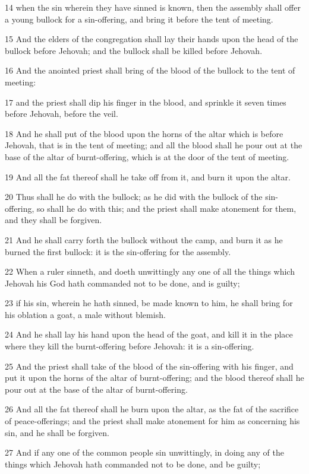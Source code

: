 \par 14 when the sin wherein they have sinned is known, then the assembly shall offer a young bullock for a sin-offering, and bring it before the tent of meeting.
\par 15 And the elders of the congregation shall lay their hands upon the head of the bullock before Jehovah; and the bullock shall be killed before Jehovah.
\par 16 And the anointed priest shall bring of the blood of the bullock to the tent of meeting:
\par 17 and the priest shall dip his finger in the blood, and sprinkle it seven times before Jehovah, before the veil.
\par 18 And he shall put of the blood upon the horns of the altar which is before Jehovah, that is in the tent of meeting; and all the blood shall he pour out at the base of the altar of burnt-offering, which is at the door of the tent of meeting.
\par 19 And all the fat thereof shall he take off from it, and burn it upon the altar.
\par 20 Thus shall he do with the bullock; as he did with the bullock of the sin-offering, so shall he do with this; and the priest shall make atonement for them, and they shall be forgiven.
\par 21 And he shall carry forth the bullock without the camp, and burn it as he burned the first bullock: it is the sin-offering for the assembly.
\par 22 When a ruler sinneth, and doeth unwittingly any one of all the things which Jehovah his God hath commanded not to be done, and is guilty;
\par 23 if his sin, wherein he hath sinned, be made known to him, he shall bring for his oblation a goat, a male without blemish.
\par 24 And he shall lay his hand upon the head of the goat, and kill it in the place where they kill the burnt-offering before Jehovah: it is a sin-offering.
\par 25 And the priest shall take of the blood of the sin-offering with his finger, and put it upon the horns of the altar of burnt-offering; and the blood thereof shall he pour out at the base of the altar of burnt-offering.
\par 26 And all the fat thereof shall he burn upon the altar, as the fat of the sacrifice of peace-offerings; and the priest shall make atonement for him as concerning his sin, and he shall be forgiven.
\par 27 And if any one of the common people sin unwittingly, in doing any of the things which Jehovah hath commanded not to be done, and be guilty;
